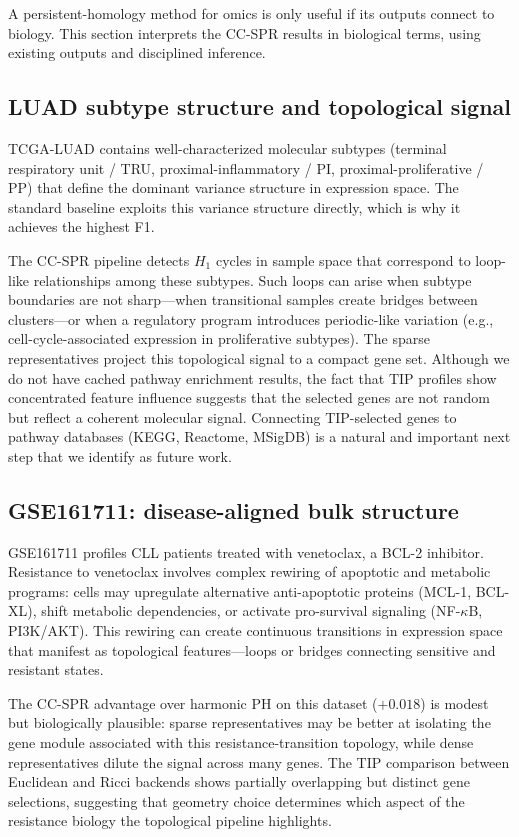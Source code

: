 \documentclass[11pt]{article}
\begin{document}
A persistent-homology method for omics is only useful if its outputs connect to biology.
This section interprets the CC-SPR results in biological terms, using existing outputs and disciplined inference.

\subsection{LUAD subtype structure and topological signal}

TCGA-LUAD contains well-characterized molecular subtypes (terminal respiratory unit / TRU, proximal-inflammatory / PI, proximal-proliferative / PP) that define the dominant variance structure in expression space.
The standard baseline exploits this variance structure directly, which is why it achieves the highest F1.

The CC-SPR pipeline detects $H_1$ cycles in sample space that correspond to loop-like relationships among these subtypes.
Such loops can arise when subtype boundaries are not sharp---when transitional samples create bridges between clusters---or when a regulatory program introduces periodic-like variation (e.g., cell-cycle-associated expression in proliferative subtypes).
The sparse representatives project this topological signal to a compact gene set.
Although we do not have cached pathway enrichment results, the fact that TIP profiles show concentrated feature influence suggests that the selected genes are not random but reflect a coherent molecular signal.
Connecting TIP-selected genes to pathway databases (KEGG, Reactome, MSigDB) is a natural and important next step that we identify as future work.

\subsection{GSE161711: disease-aligned bulk structure}

GSE161711 profiles CLL patients treated with venetoclax, a BCL-2 inhibitor.
Resistance to venetoclax involves complex rewiring of apoptotic and metabolic programs: cells may upregulate alternative anti-apoptotic proteins (MCL-1, BCL-XL), shift metabolic dependencies, or activate pro-survival signaling (NF-$\kappa$B, PI3K/AKT).
This rewiring can create continuous transitions in expression space that manifest as topological features---loops or bridges connecting sensitive and resistant states.

The CC-SPR advantage over harmonic PH on this dataset ($+0.018$) is modest but biologically plausible: sparse representatives may be better at isolating the gene module associated with this resistance-transition topology, while dense representatives dilute the signal across many genes.
The TIP comparison between Euclidean and Ricci backends shows partially overlapping but distinct gene selections, suggesting that geometry choice determines which aspect of the resistance biology the topological pipeline highlights.
\end{document}
